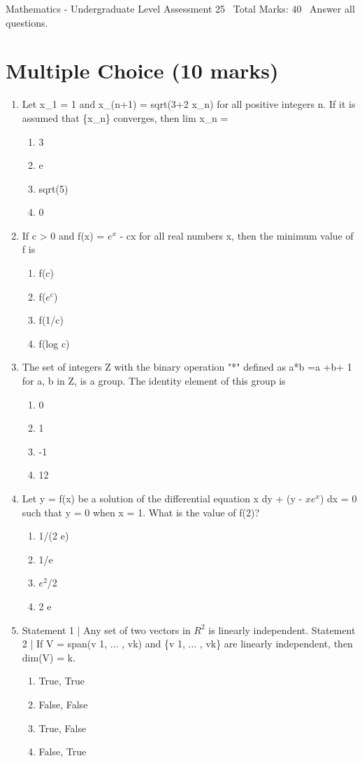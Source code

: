 \documentclass[12pt]{article}
\begin{document}
\begin{center}
Mathematics - Undergraduate Level Assessment 25 \
Total Marks: 40 \
Answer all questions.
\end{center}

\section*{Multiple Choice (10 marks)}
\begin{enumerate}[label=\arabic*.]
\item Let x\_1 = 1 and x\_(n+1) = sqrt(3+2 x\_n) for all positive integers n. If it is assumed that \{x\_n\} converges, then lim x\_n =
\begin{enumerate}[label=(\alph*)]
    \item 3
    \item e
    \item sqrt(5)
    \item 0
\end{enumerate}
\item If c \textgreater{} 0 and f(x) = $e^x$ - cx for all real numbers x, then the minimum value of f is
\begin{enumerate}[label=(\alph*)]
    \item f(c)
    \item f($e^c$)
    \item f(1/c)
    \item f(log c)
\end{enumerate}
\item The set of integers Z with the binary operation "*" defined as a*b =a +b+ 1 for a, b in Z, is a group. The identity element of this group is
\begin{enumerate}[label=(\alph*)]
    \item 0
    \item 1
    \item -1
    \item 12
\end{enumerate}
\item Let y = f(x) be a solution of the differential equation x dy + (y - $xe^x$) dx = 0 such that y = 0 when x = 1. What is the value of f(2)?
\begin{enumerate}[label=(\alph*)]
    \item 1/(2 e)
    \item 1/e
    \item $e^2$/2
    \item 2 e
\end{enumerate}
\item Statement 1 | Any set of two vectors in $R^2$ is linearly independent. Statement 2 | If V = span(v 1, ... , vk) and \{v 1, ... , vk\} are linearly independent, then dim(V) = k.
\begin{enumerate}[label=(\alph*)]
    \item True, True
    \item False, False
    \item True, False
    \item False, True
\end{enumerate}
\end{enumerate}
\end{document}
